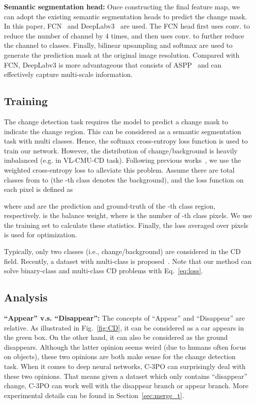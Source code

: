 \documentclass[review]{elsarticle}
\begin{document}
\textbf{Semantic segmentation head:} Once constructing the final feature map, we can adopt the existing semantic segmentation heads to predict the change mask. In this paper, FCN~\cite{FCN} and DeepLabv3~\cite{deeplabv3} are used. The FCN head first uses  conv. to reduce the number of channel by 4 times, and then uses  conv. to further reduce the channel to  classes. Finally,  bilinear upsampling and softmax are used to generate the prediction mask at the original image resolution. Compared with FCN, DeepLabv3 is more advantageous that consists of ASPP~\cite{ASPP} and can effectively capture multi-scale information. 

\subsection{Training}

The change detection task requires the model to predict a change mask to indicate the change region. This can be considered as a semantic segmentation task with multi classes. Hence, the softmax cross-entropy loss function is used to train our network. However, the distribution of change/background is heavily imbalanced (e.g.  in VL-CMU-CD task). Following previous works~\cite{HPCFNet}, we use the weighted cross-entropy loss to alleviate this problem. Assume there are total  classes from  to  (the -th class denotes the background), and the loss function on each pixel is defined as

where  and  are the prediction and ground-truth of the -th class region, respectively.  is the balance weight, where  is the number of -th class pixels. We use the training set to calculate these statistics. Finally, the loss averaged over pixels is used for optimization. 

Typically, only two classes (i.e., change/background) are considered in the CD field. Recently, a dataset with multi-class is proposed~\cite{changesim}. Note that our method can solve binary-class and multi-class CD problems with Eq.~\ref{eq:loss}.

\subsection{Analysis}
\label{sec:analysis}

\textbf{``Appear'' v.s. ``Disappear'':} The concepts of ``Appear'' and ``Disappear'' are relative. As illustrated in Fig.~\ref{fig:CD}, it can be considered as a car appears in the green box. On the other hand, it can also be considered as the ground disappears. Although the latter opinion seems weird (due to humans often focus on objects), these two opinions are both make sense for the change detection task. When it comes to deep neural networks, C-3PO can surprisingly deal with these two opinions. That means given a dataset which only contains ``disappear'' change, C-3PO can work well with the disappear branch or appear branch. More experimental details can be found in Section~\ref{sec:merge_t}.
\end{document}
